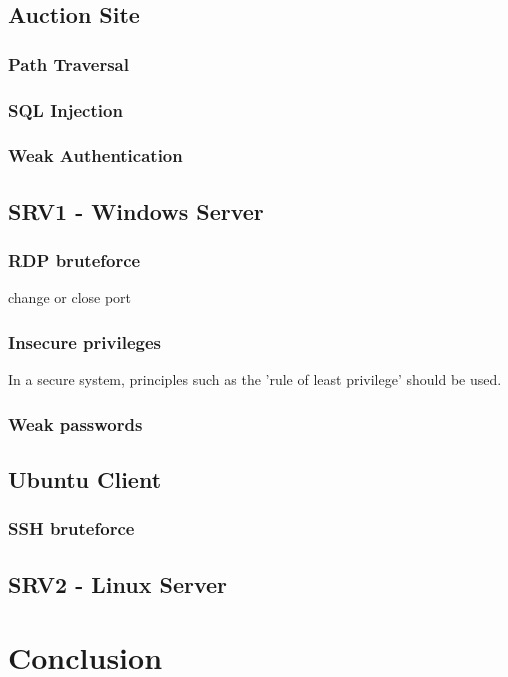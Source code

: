 \documentclass{report}
\begin{document}
\section{Auction Site}
\subsection{Path Traversal}
\subsection{SQL Injection}
\subsection{Weak Authentication}

\section{SRV1 - Windows Server}
\subsection{RDP bruteforce}
	change or close port
\subsection{Insecure privileges}
In a secure system, principles such as the 'rule of least privilege' should be used.
\subsection{Weak passwords}

\section{Ubuntu Client}
\subsection{SSH bruteforce}

\section{SRV2 - Linux Server}



\chapter{Conclusion}
\end{document}

